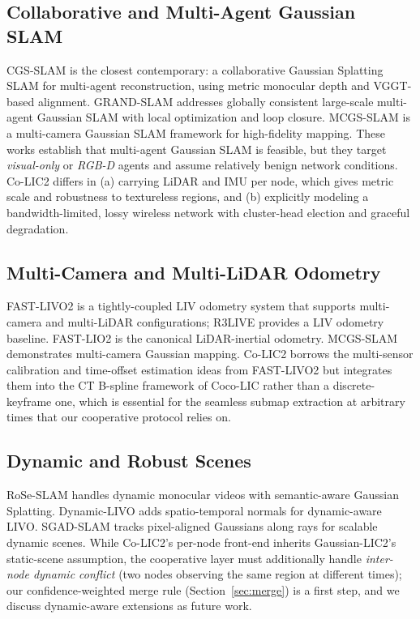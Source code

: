 \subsection{Collaborative and Multi-Agent Gaussian SLAM}
CGS-SLAM \cite{deambrogi2026cgsslam} is the closest contemporary: a
collaborative Gaussian Splatting SLAM for multi-agent reconstruction, using
metric monocular depth and VGGT-based alignment. GRAND-SLAM
\cite{thomas2025grandslam} addresses globally consistent large-scale
multi-agent Gaussian SLAM with local optimization and loop closure.
MCGS-SLAM \cite{cao2026mcgsslam} is a multi-camera Gaussian SLAM framework for
high-fidelity mapping. These works establish that multi-agent Gaussian SLAM is
feasible, but they target \emph{visual-only} or \emph{RGB-D} agents and assume
relatively benign network conditions. Co-LIC2 differs in (a) carrying LiDAR
and IMU per node, which gives metric scale and robustness to textureless
regions, and (b) explicitly modeling a bandwidth-limited, lossy wireless
network with cluster-head election and graceful degradation.

\subsection{Multi-Camera and Multi-LiDAR Odometry}
FAST-LIVO2 \cite{zheng2024fastlivo2} is a tightly-coupled LIV odometry system
that supports multi-camera and multi-LiDAR configurations; R3LIVE
\cite{lin2024r3live} provides a LIV odometry baseline. FAST-LIO2
\cite{xu2022fastlio2} is the canonical LiDAR-inertial odometry. MCGS-SLAM
\cite{cao2026mcgsslam} demonstrates multi-camera Gaussian mapping. Co-LIC2
borrows the multi-sensor calibration and time-offset estimation ideas from
FAST-LIVO2 but integrates them into the CT B-spline framework of Coco-LIC
rather than a discrete-keyframe one, which is essential for the seamless
submap extraction at arbitrary times that our cooperative protocol relies on.

\subsection{Dynamic and Robust Scenes}
RoSe-SLAM \cite{wang2026roseslam} handles dynamic monocular videos with
semantic-aware Gaussian Splatting. Dynamic-LIVO \cite{zhang2026dynamiclivo}
adds spatio-temporal normals for dynamic-aware LIVO. SGAD-SLAM
\cite{hu2026sgad} tracks pixel-aligned Gaussians along rays for scalable
dynamic scenes. While Co-LIC2's per-node front-end inherits Gaussian-LIC2's
static-scene assumption, the cooperative layer must additionally handle
\emph{inter-node dynamic conflict} (two nodes observing the same region at
different times); our confidence-weighted merge rule (Section~\ref{sec:merge})
is a first step, and we discuss dynamic-aware extensions as future work.

